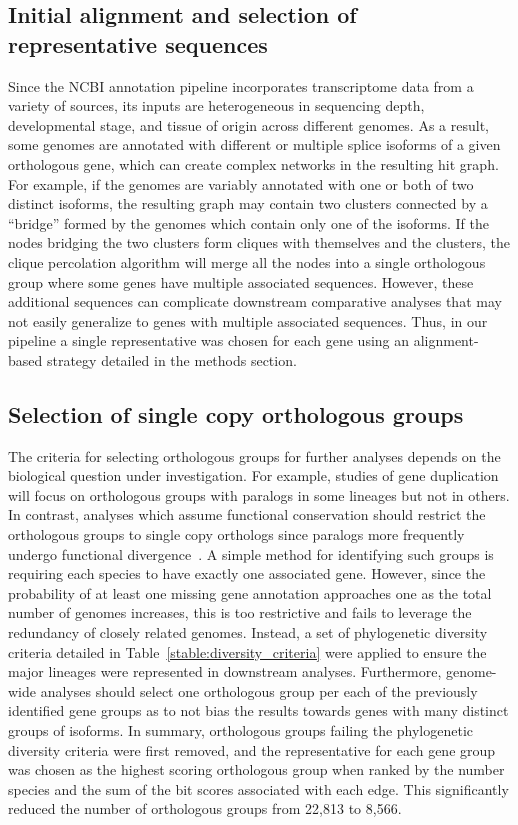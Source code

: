 \subsection*{Initial alignment and selection of representative sequences}
Since the NCBI annotation pipeline incorporates transcriptome data from a variety of sources, its inputs are heterogeneous in sequencing depth, developmental stage, and tissue of origin across different genomes. As a result, some genomes are annotated with different or multiple splice isoforms of a given orthologous gene, which can create complex networks in the resulting hit graph. For example, if the genomes are variably annotated with one or both of two distinct isoforms, the resulting graph may contain two clusters connected by a ``bridge'' formed by the genomes which contain only one of the isoforms. If the nodes bridging the two clusters form cliques with themselves and the clusters, the clique percolation algorithm will merge all the nodes into a single orthologous group where some genes have multiple associated sequences. However, these additional sequences can complicate downstream comparative analyses that may not easily generalize to genes with multiple associated sequences. Thus, in our pipeline a single representative was chosen for each gene using an alignment-based strategy detailed in the methods section.

\subsection*{Selection of single copy orthologous groups}
The criteria for selecting orthologous groups for further analyses depends on the biological question under investigation. For example, studies of gene duplication will focus on orthologous groups with paralogs in some lineages but not in others. In contrast, analyses which assume functional conservation should restrict the orthologous groups to single copy orthologs since paralogs more frequently undergo functional divergence~\cite{Altenhoff2012, Pegueroles2013, Soria2014}. A simple method for identifying such groups is requiring each species to have exactly one associated gene. However, since the probability of at least one missing gene annotation approaches one as the total number of genomes increases, this is too restrictive and fails to leverage the redundancy of closely related genomes. Instead, a set of phylogenetic diversity criteria detailed in Table~\ref{stable:diversity_criteria} were applied to ensure the major lineages were represented in downstream analyses. Furthermore, genome-wide analyses should select one orthologous group per each of the previously identified gene groups as to not bias the results towards genes with many distinct groups of isoforms. In summary, orthologous groups failing the phylogenetic diversity criteria were first removed, and the representative for each gene group was chosen as the highest scoring orthologous group when ranked by the number species and the sum of the bit scores associated with each edge. This significantly reduced the number of orthologous groups from 22,813 to 8,566.

